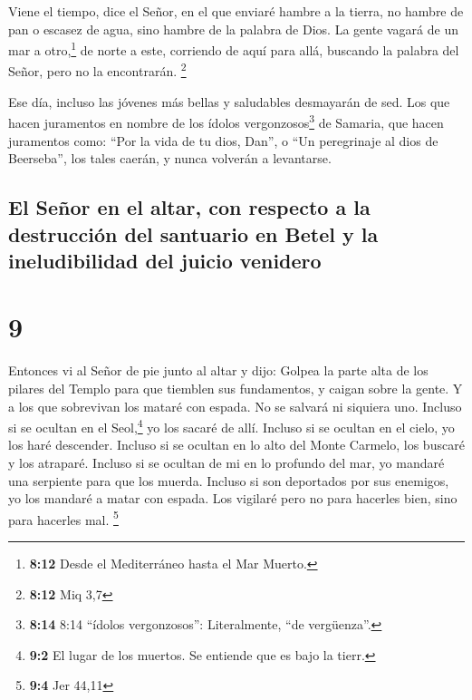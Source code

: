  Viene el tiempo, dice el Señor, en el que enviaré hambre
a la tierra, no hambre de pan o escasez de agua, sino hambre de la
palabra de Dios.  La gente vagará de un mar a
otro,\footnote{\textbf{8:12} Desde el Mediterráneo hasta el Mar Muerto.}
de norte a este, corriendo de aquí para allá, buscando la palabra del
Señor, pero no la encontrarán. \footnote{\textbf{8:12} Miq 3,7}

 Ese día, incluso las jóvenes más bellas y saludables
desmayarán de sed.  Los que hacen juramentos en nombre de
los ídolos vergonzosos\footnote{\textbf{8:14} 8:14 ``ídolos
  vergonzosos'': Literalmente, ``de vergüenza''.} de Samaria, que hacen
juramentos como: ``Por la vida de tu dios, Dan'', o ``Un peregrinaje al
dios de Beerseba'', los tales caerán, y nunca volverán a levantarse.

\hypertarget{el-seuxf1or-en-el-altar-con-respecto-a-la-destrucciuxf3n-del-santuario-en-betel-y-la-ineludibilidad-del-juicio-venidero}{%
\subsection{El Señor en el altar, con respecto a la destrucción del
santuario en Betel y la ineludibilidad del juicio
venidero}\label{el-seuxf1or-en-el-altar-con-respecto-a-la-destrucciuxf3n-del-santuario-en-betel-y-la-ineludibilidad-del-juicio-venidero}}

\hypertarget{section-8}{%
\section{9}\label{section-8}}

 Entonces vi al Señor de pie junto al altar y dijo: Golpea
la parte alta de los pilares del Templo para que tiemblen sus
fundamentos, y caigan sobre la gente. Y a los que sobrevivan los mataré
con espada. No se salvará ni siquiera uno.  Incluso si se
ocultan en el Seol,\footnote{\textbf{9:2} El lugar de los muertos. Se
  entiende que es bajo la tierr.} yo los sacaré de allí. Incluso si se
ocultan en el cielo, yo los haré descender.  Incluso si se
ocultan en lo alto del Monte Carmelo, los buscaré y los atraparé.
Incluso si se ocultan de mi en lo profundo del mar, yo mandaré una
serpiente para que los muerda.  Incluso si son deportados
por sus enemigos, yo los mandaré a matar con espada. Los vigilaré pero
no para hacerles bien, sino para hacerles mal. \footnote{\textbf{9:4}
  Jer 44,11}

